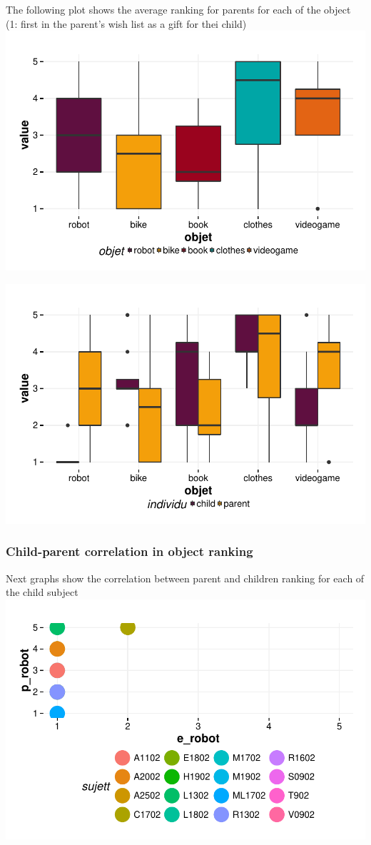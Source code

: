 \documentclass{article}
\begin{document}
The following plot shows the average ranking for parents for each of the object (1: first in the parent's wish list as a gift for thei child)
\includegraphics{interviews/interviews-plot_coirs_parent}

\includegraphics{interviews/interviews-plot_coirs_parent_enfant}

\subsubsection{Child-parent correlation in object ranking} 
Next graphs show the correlation between parent and children ranking for each of the child subject\newline
\includegraphics{interviews/interviews-plot_coirs_parent_enfant_robot}
\end{document}
